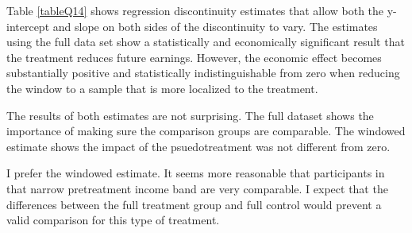 \documentclass[12pt]{article}
\begin{document}
\begin{list}{}{}
    \item Table \ref{tableQ14} shows regression discontinuity estimates that 
    allow both the y-intercept and slope on both sides of the discontinuity to 
    vary.  The estimates using the full data set show a statistically and 
    economically significant result that the treatment reduces future earnings. 
    However, the economic effect becomes substantially positive and statistically 
    indistinguishable from zero when reducing the window to a sample that is 
    more localized to the treatment.

    The results of both estimates are not surprising.  The full dataset shows the 
    importance of making sure the comparison groups are comparable.  The 
    windowed estimate shows the impact of the psuedotreatment was not different 
    from zero.  

    I prefer the windowed estimate.  It seems more reasonable that participants 
    in that narrow pretreatment income band are very comparable.  I expect that 
    the differences between the full treatment group and full control would 
    prevent a valid comparison for this type of treatment.
\end{list}
\end{document}
